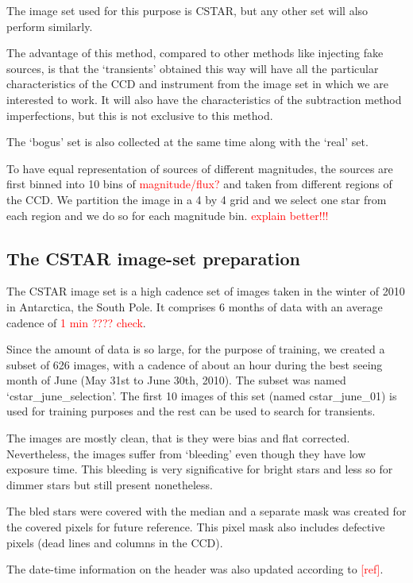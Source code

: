 The image set used for this purpose is CSTAR, but any other set will also perform similarly.

The advantage of this method, compared to other methods like injecting fake sources, is that the `transients' obtained this way will have all the particular characteristics of the CCD and instrument from the image set in which we are interested to work. It will also have the characteristics of the subtraction method imperfections, but this is not exclusive to this method.

The `bogus' set is also collected at the same time along with the `real' set.

To have equal representation of sources of different magnitudes, the sources are first binned into 10 bins of \textcolor{red}{magnitude/flux?} and taken from different regions of the CCD.
We partition the image in a 4 by 4 grid and we select one star from each region and we do so for each magnitude bin. \textcolor{red}{explain better!!!}

\subsection{The CSTAR image-set preparation}

The CSTAR image set is a high cadence set of images taken in the winter of 2010 in Antarctica, the South Pole. It comprises 6 months of data with an average cadence of \textcolor{red}{1 min ???? check}.

Since the amount of data is so large, for the purpose of training, we created a subset of 626 images, with a cadence of about an hour during the best seeing month of June (May 31st to June 30th, 2010). The subset was named `cstar\_june\_selection'. The first 10 images of this set (named cstar\_june\_01) is used for training purposes and the rest can be used to search for transients. 

The images are mostly clean, that is they were bias and flat corrected.
Nevertheless, the images suffer from `bleeding' even though they have low exposure time. This bleeding is very significative for bright stars and less so for dimmer stars but still present nonetheless.

The bled stars were covered with the median and a separate mask was created for the covered pixels for future reference. This pixel mask also includes defective pixels (dead lines and columns in the CCD).

The date-time information on the header was also updated according to \textcolor{red}{[ref]}.

